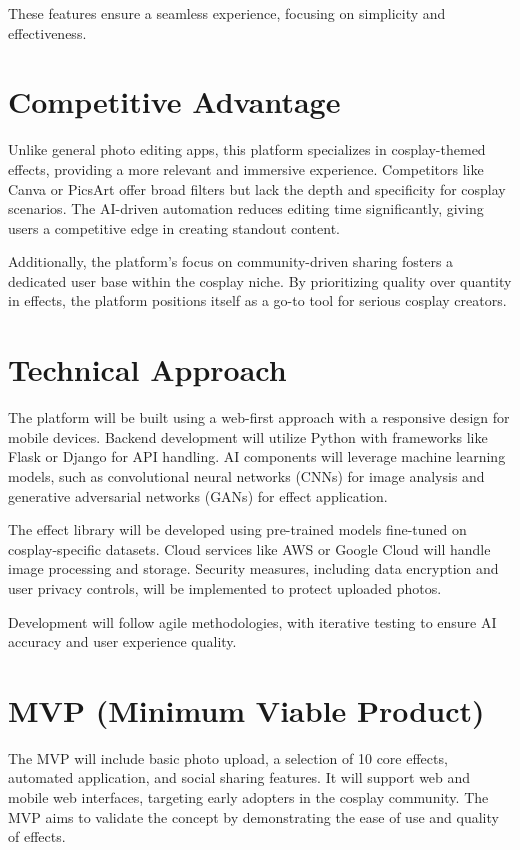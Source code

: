 \documentclass[12pt]{article}
\begin{document}
These features ensure a seamless experience, focusing on simplicity and effectiveness.

\section{Competitive Advantage}

Unlike general photo editing apps, this platform specializes in cosplay-themed effects, providing a more relevant and immersive experience. Competitors like Canva or PicsArt offer broad filters but lack the depth and specificity for cosplay scenarios. The AI-driven automation reduces editing time significantly, giving users a competitive edge in creating standout content.

Additionally, the platform's focus on community-driven sharing fosters a dedicated user base within the cosplay niche. By prioritizing quality over quantity in effects, the platform positions itself as a go-to tool for serious cosplay creators.

\section{Technical Approach}

The platform will be built using a web-first approach with a responsive design for mobile devices. Backend development will utilize Python with frameworks like Flask or Django for API handling. AI components will leverage machine learning models, such as convolutional neural networks (CNNs) for image analysis and generative adversarial networks (GANs) for effect application.

The effect library will be developed using pre-trained models fine-tuned on cosplay-specific datasets. Cloud services like AWS or Google Cloud will handle image processing and storage. Security measures, including data encryption and user privacy controls, will be implemented to protect uploaded photos.

Development will follow agile methodologies, with iterative testing to ensure AI accuracy and user experience quality.

\section{MVP (Minimum Viable Product)}

The MVP will include basic photo upload, a selection of 10 core effects, automated application, and social sharing features. It will support web and mobile web interfaces, targeting early adopters in the cosplay community. The MVP aims to validate the concept by demonstrating the ease of use and quality of effects.
\end{document}
